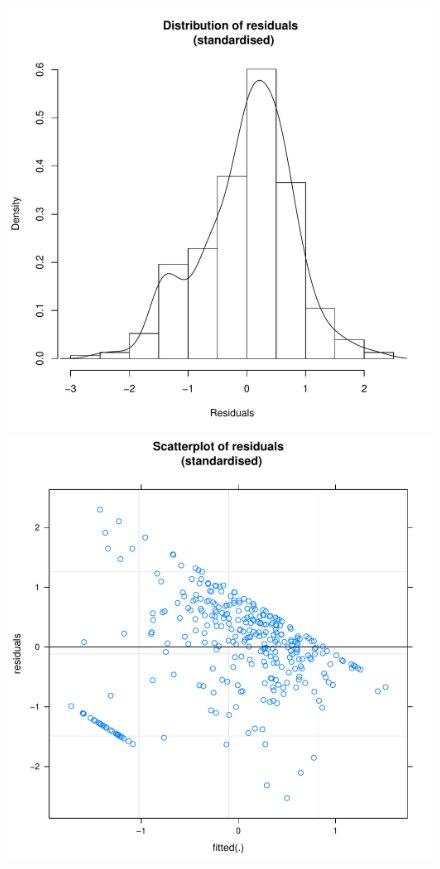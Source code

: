 \begin{CJK}{UTF8}{gbsn}



  \begin{figure}[!htbp]
   \includegraphics[scale =.4]{images/MLM32aHist.pdf}
        \includegraphics[scale =.4]{images/MLM32aScatter.pdf}

\end{figure}
\end{CJK}
